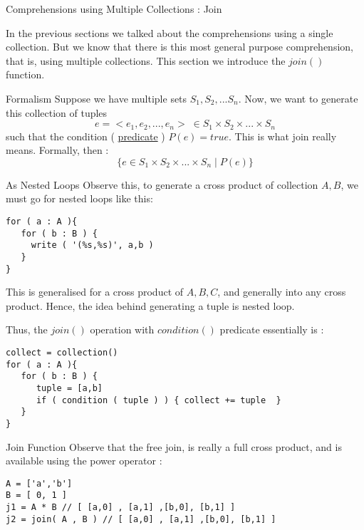 \begin{section}{Comprehensions using Multiple Collections : Join}

In the previous sections we talked about the comprehensions using a single collection.
But we know that there is this most general purpose comprehension, that is, 
using multiple collections. This section we introduce the $join()$ function.

\begin{subsection}{Formalism}
Suppose we have multiple sets $S_1,S_2,...S_n$.
Now, we want to generate this collection of tuples 
$$
e = <e_1,e_2,...,e_n> \; \in S_1 \times S_2 \times ... \times S_n
$$ 
such that the condition ( \href{https://en.wikipedia.org/wiki/Predicate\_(mathematical\_logic)}{predicate} ) $P(e) = true $. 
This is what join really means. Formally, then :
$$
\{  e \in S_1 \times S_2 \times ... \times S_n \; | \; P(e) \} 
$$

\end{subsection}

\begin{subsection}{As Nested Loops}
Observe this, to generate a cross product of collection $A,B$, we must
go for nested loops like this:

\begin{lstlisting}[style=JexlStyle]
for ( a : A ){
   for ( b : B ) {
     write ( '(%s,%s)', a,b ) 
   }
}
\end{lstlisting}
This is generalised for a cross product of $A,B,C$, and generally into any cross product. 
Hence, the idea behind generating a tuple is nested loop.

Thus, the $join()$ operation with $condition()$ predicate essentially is :

\begin{lstlisting}[style=JexlStyle]
collect = collection()
for ( a : A ){
   for ( b : B ) {
      tuple = [a,b]
      if ( condition ( tuple ) ) { collect += tuple  } 
   }
}
\end{lstlisting}
\end{subsection}

\begin{subsection}{Join Function}
Observe that the free join, is really a full cross product, 
and is available using the power operator :

\begin{lstlisting}[style=JexlStyle]
A = ['a','b']
B = [ 0, 1 ]
j1 = A * B // [ [a,0] , [a,1] ,[b,0], [b,1] ]
j2 = join( A , B ) // [ [a,0] , [a,1] ,[b,0], [b,1] ]
\end{lstlisting}


\end{subsection}
\end{section}

